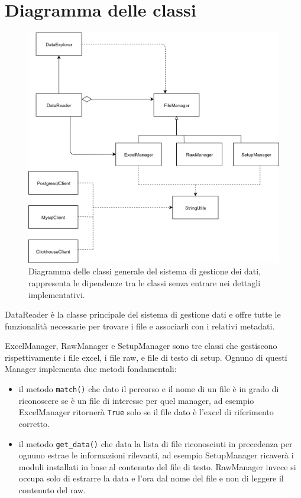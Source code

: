 \section{Diagramma delle classi} \label{DiagrammaDelleClassiDMD}

\begin{figure}
	\includegraphics[width=\textwidth]{figures/DiagrammaDelleClassiDMD}
	\caption[Diagramma delle classi sistema di gestione dei dai]{Diagramma delle classi generale del sistema di gestione dei dati, rappresenta le dipendenze tra le classi senza entrare nei dettagli implementativi. 
		\label{fig:DiagrammaDelleClassiDMD}}
\end{figure}


DataReader è la classe principale del sistema di gestione dati e offre tutte le funzionalità necessarie per trovare i file e associarli con i relativi metadati.

ExcelManager, RawManager e SetupManager sono tre classi che gestiscono rispettivamente i file excel, i file raw, e file di testo di setup. Ognuno di questi Manager implementa due metodi fondamentali:

\begin{itemize}
	\item il metodo \texttt{match()} che dato il percorso e il nome di un file è in grado di riconoscere se è un file di interesse per quel manager, ad esempio ExcelManager ritornerà \texttt{True} solo se il file dato è l'excel di riferimento corretto.
	
	\item il metodo \texttt{get\_data()} che data la lista di file riconosciuti in precedenza per ognuno estrae le informazioni rilevanti, ad esempio SetupManager ricaverà i moduli installati in base al contenuto del file di testo. RawManager invece si occupa solo di estrarre la data e l'ora dal nome del file e non di leggere il contenuto del raw.
\end{itemize}

